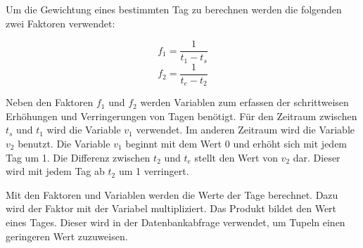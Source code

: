 Um die Gewichtung eines bestimmten Tag zu berechnen werden die folgenden zwei Faktoren verwendet:

\begin{equation}
f_1 = \frac{1}{t_1 - t_{s}}
\end{equation}
\begin{equation}
f_2 = \frac{1}{t_{e} - t_2}
\end{equation}

Neben den Faktoren $f_1$ und $f_2$ werden Variablen zum erfassen der schrittweisen Erhöhungen und Verringerungen von Tagen benötigt. Für den Zeitraum zwischen   
$t_{s}$ und $t_{1}$ wird die Variable $v_{1}$ verwendet. Im anderen Zeitraum wird die Variable $v_{2}$ benutzt. Die Variable $v_{1}$ beginnt mit dem Wert 0 und erhöht sich mit jedem Tag um 1. Die Differenz zwischen $t_{2}$ und $t_{e}$ stellt den Wert von $v_{2}$ dar. Dieser wird mit jedem Tag ab $t_{2}$ um 1 verringert.

Mit den Faktoren und Variablen werden die Werte der Tage berechnet. Dazu wird der Faktor mit der Variabel multipliziert. Das Produkt bildet den Wert eines Tages. Dieser wird in der Datenbankabfrage verwendet, um Tupeln einen geringeren Wert zuzuweisen. 

